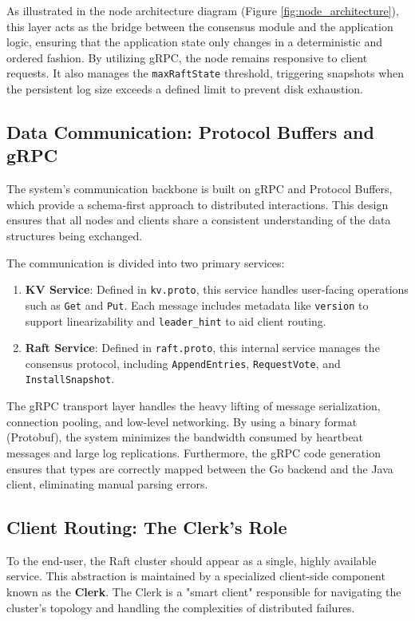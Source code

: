 As illustrated in the node architecture diagram (Figure \ref{fig:node_architecture}), this layer acts as the bridge between the consensus module and the application logic, ensuring that the application state only changes in a deterministic and ordered fashion. By utilizing gRPC, the node remains responsive to client requests. It also manages the \texttt{maxRaftState} threshold, triggering snapshots when the persistent log size exceeds a defined limit to prevent disk exhaustion.

\subsection{Data Communication: Protocol Buffers and gRPC}
The system's communication backbone is built on gRPC and Protocol Buffers, which provide a schema-first approach to distributed interactions. This design ensures that all nodes and clients share a consistent understanding of the data structures being exchanged.

The communication is divided into two primary services:
\begin{enumerate}
    \item \textbf{KV Service}: Defined in \texttt{kv.proto}, this service handles user-facing operations such as \texttt{Get} and \texttt{Put}. Each message includes metadata like \texttt{version} to support linearizability and \texttt{leader\_hint} to aid client routing.
    \item \textbf{Raft Service}: Defined in \texttt{raft.proto}, this internal service manages the consensus protocol, including \texttt{AppendEntries}, \texttt{RequestVote}, and \texttt{InstallSnapshot}.
\end{enumerate}

The gRPC transport layer handles the heavy lifting of message serialization, connection pooling, and low-level networking. By using a binary format (Protobuf), the system minimizes the bandwidth consumed by heartbeat messages and large log replications. Furthermore, the gRPC code generation ensures that types are correctly mapped between the Go backend and the Java client, eliminating manual parsing errors.

\subsection{Client Routing: The Clerk's Role}
To the end-user, the Raft cluster should appear as a single, highly available service. This abstraction is maintained by a specialized client-side component known as the \textbf{Clerk}. The Clerk is a "smart client" responsible for navigating the cluster's topology and handling the complexities of distributed failures.

